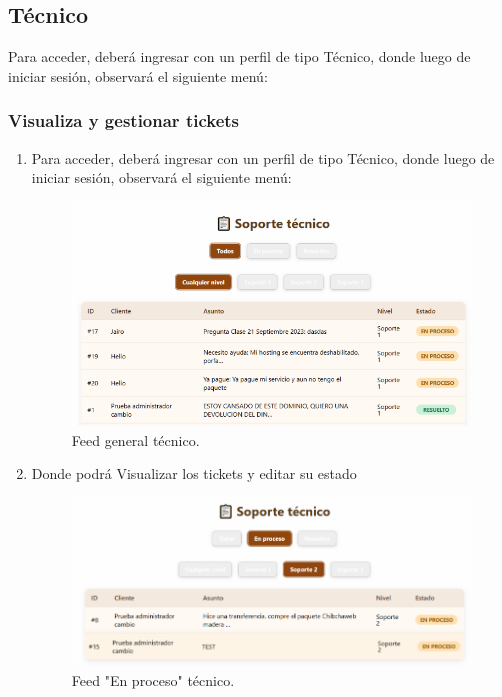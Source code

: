 \subsection{Técnico}
Para acceder, deberá ingresar con un perfil de tipo Técnico, donde luego de iniciar sesión, observará el siguiente menú:

\subsubsection*{Visualiza y gestionar tickets}

\begin{enumerate}
	\item Para acceder, deberá ingresar con un perfil de tipo Técnico, donde luego de iniciar sesión, observará el siguiente menú:
   	\begin{figure}[H]
    \centering
    \includegraphics[width=0.75\linewidth]{guiamodulo/tecnico-menu.png}
    \caption{Feed general técnico.}
    \label{fig:tecnico-menu}
    \end{figure}

    \item Donde podrá Visualizar los tickets y editar su estado
    \begin{figure}[H]
    \centering
    \includegraphics[width=0.75\linewidth]{guiamodulo/tecnico-proceso.png}
    \caption{Feed "En proceso" técnico.}
    \label{fig:tecnico-proceso}
    \end{figure}
\end{enumerate}


